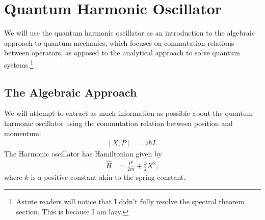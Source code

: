 \documentclass[12pt]{extarticle}
\theoremstyle{plain}
\theoremstyle{definition}
\theoremstyle{remark}
\renewcommand{\newline}{\hfill\break}
\begin{document}
  \section{Quantum Harmonic Oscillator}%
  We will use the quantum harmonic oscillator as an introduction to the algebraic approach to quantum mechanics, which focuses on commutation relations between operators, as opposed to the analytical approach to solve quantum systems.\footnote{Astute readers will notice that I didn't fully resolve the spectral theorem section. This is because I am lazy.}
  \subsection{The Algebraic Approach}%
  We will attempt to extract as much information as possible about the quantum harmonic oscillator using the commutation relation between position and momentum:
  \begin{align*}
    \left[X,P\right] &= i\hbar I.
  \end{align*}
  The Harmonic oscillator has Hamiltonian given by
  \begin{align*}
    \hat{H} &= \frac{P^2}{2m} + \frac{k}{2}X^2,
  \end{align*}
  where $k$ is a positive constant akin to the spring constant.\newline
\end{document}

